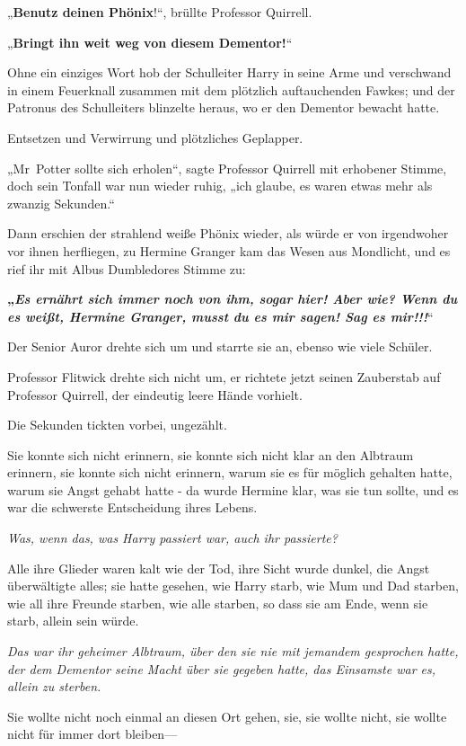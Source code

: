 {„\textbf{Benutz deinen Phönix}!“, brüllte Professor Quirrell.

„\textbf{Bringt ihn weit weg von diesem Dementor!}“

Ohne ein einziges Wort hob der Schulleiter Harry in seine Arme und verschwand in einem Feuerknall zusammen mit dem plötzlich auftauchenden Fawkes; und der Patronus des Schulleiters blinzelte heraus, wo er den Dementor bewacht hatte.

Entsetzen und Verwirrung und plötzliches Geplapper.

„Mr~Potter sollte sich erholen“, sagte Professor Quirrell mit erhobener Stimme, doch sein Tonfall war nun wieder ruhig, „ich glaube, es waren etwas mehr als zwanzig Sekunden.“

Dann erschien der strahlend weiße Phönix wieder, als würde er von irgendwoher vor ihnen herfliegen, zu Hermine Granger kam das Wesen aus Mondlicht, und es rief ihr mit Albus Dumbledores Stimme zu:

\textbf{„\emph{Es ernährt sich immer noch von ihm, sogar hier! Aber wie? Wenn du es weißt, Hermine Granger, musst du es mir sagen! Sag es mir!!!}}“

Der Senior Auror drehte sich um und starrte sie an, ebenso wie viele Schüler.

Professor Flitwick drehte sich nicht um, er richtete jetzt seinen Zauberstab auf Professor Quirrell, der eindeutig leere Hände vorhielt.

Die Sekunden tickten vorbei, ungezählt.

Sie konnte sich nicht erinnern, sie konnte sich nicht klar an den Albtraum erinnern, sie konnte sich nicht erinnern, warum sie es für möglich gehalten hatte, warum sie Angst gehabt hatte - da wurde Hermine klar, was sie tun sollte, und es war die schwerste Entscheidung ihres Lebens.

\emph{Was, wenn das, was Harry passiert war, auch ihr passierte?}

Alle ihre Glieder waren kalt wie der Tod, ihre Sicht wurde dunkel, die Angst überwältigte alles; sie hatte gesehen, wie Harry starb, wie Mum und Dad starben, wie all ihre Freunde starben, wie alle starben, so dass sie am Ende, wenn sie starb, allein sein würde.

\emph{Das war ihr geheimer Albtraum, über den sie nie mit jemandem gesprochen hatte, der dem Dementor seine Macht über sie gegeben hatte, das Einsamste war es, allein zu sterben.}

Sie wollte nicht noch einmal an diesen Ort gehen, sie, sie wollte nicht, sie wollte nicht für immer dort bleiben—

}
